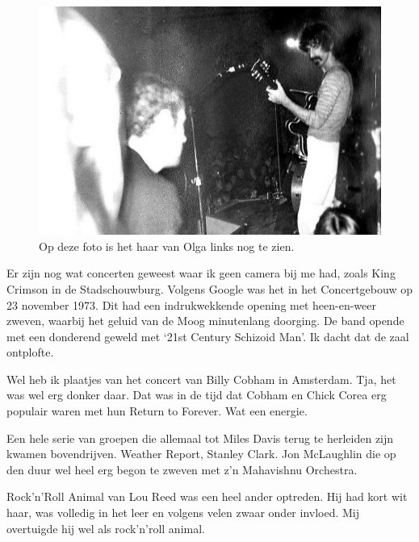 \documentclass[12pt,twoside, openright]{memoir}
\begin{document}
\begin{figure}
\centering
\includegraphics[width=\textwidth]{img/ch31/zappaolga}
\caption*{\footnotesize Op deze foto is het haar van Olga links nog te zien.}
\end{figure}

Er zijn nog wat concerten geweest waar ik geen camera bij me had, zoals King Crimson in de Stadschouwburg. Volgens Google was het in het Concertgebouw op 23 november 1973. Dit had een indrukwekkende opening met heen-en-weer zweven, waarbij het geluid van de Moog minutenlang doorging. De band opende met een donderend geweld met `21st Century Schizoid Man'. Ik dacht dat de zaal ontplofte.

Wel heb ik plaatjes van het concert van Billy Cobham in Amsterdam. Tja, het was wel erg donker daar. Dat was in de tijd dat Cobham en Chick Corea erg populair waren met hun Return to Forever. Wat een energie. 

Een hele serie van groepen die allemaal tot Miles Davis terug te herleiden zijn kwamen bovendrijven. Weather Report, Stanley Clark. Jon McLaughlin die op den duur wel heel erg begon te zweven met z’n Mahavishnu Orchestra.

Rock'n'Roll Animal van Lou Reed was een heel ander optreden. Hij had kort wit haar, was volledig in het leer en volgens velen zwaar onder invloed. Mij overtuigde hij wel als rock'n'roll animal.
\end{document}
